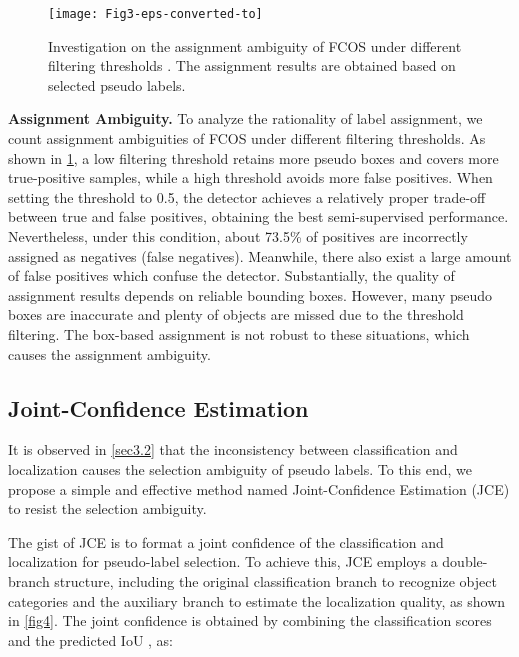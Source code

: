 \documentclass[10pt,twocolumn,letterpaper]{article}
\begin{document}
\begin{figure}[t]
    \centering
\setlength{\belowcaptionskip}{-10pt}
    \texttt{[image: Fig3-eps-converted-to]}
    \caption{Investigation on the assignment ambiguity of FCOS under different filtering thresholds . The assignment results are obtained based on selected pseudo labels.}
    \label{fig3}
\end{figure}


\noindent\textbf{Assignment Ambiguity.}
To analyze the rationality of label assignment, we count assignment ambiguities of FCOS under different filtering thresholds.
As shown in \cref{fig3}, a low filtering threshold retains more pseudo boxes and covers more true-positive samples, while a high threshold avoids more false positives.
When setting the threshold to 0.5, the detector achieves a relatively proper trade-off between true and false positives, obtaining the best semi-supervised performance.
Nevertheless, under this condition, about 73.5\% of positives are incorrectly assigned as negatives (false negatives).
Meanwhile, there also exist a large amount of false positives which confuse the detector.
Substantially, the quality of assignment results depends on reliable bounding boxes.
However, many pseudo boxes are inaccurate and plenty of objects are missed due to the threshold filtering.
The box-based assignment is not robust to these situations, which causes the assignment ambiguity.


\subsection{Joint-Confidence Estimation}
\label{sec3.3}





It is observed in \cref{sec3.2} that the inconsistency between classification and localization causes the selection ambiguity of pseudo labels.
To this end, we propose a simple and effective method named Joint-Confidence Estimation (JCE) to resist the selection ambiguity.


The gist of JCE is to format a joint confidence of the classification and localization for pseudo-label selection.
To achieve this, JCE employs a double-branch structure, including the original classification branch to recognize object categories and the auxiliary branch to estimate the localization quality, as shown in \cref{fig4}.
The joint confidence  is obtained by combining the classification scores  and the predicted IoU , as:
\end{document}
